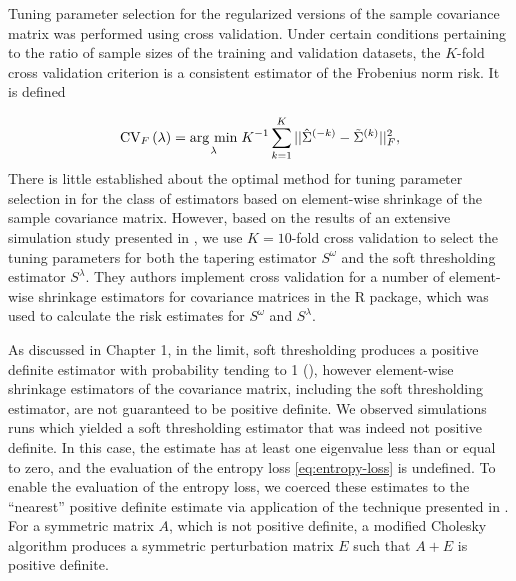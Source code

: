 %

Tuning parameter selection for the regularized versions of the sample covariance matrix was performed using cross validation. Under certain conditions pertaining to the ratio of sample sizes of the training and validation datasets, the $K$-fold cross validation criterion is a consistent estimator of the Frobenius norm risk. It is defined 

\begin{equation} \label{eq:K-fold-matrix--cv}
\mbox{CV}_F\left(\lambda \right) = \underset{\lambda}{\operatorname{arg}\,\operatorname{min}}\; K^{-1} \sum_{k = 1}^K  \vert \vert\hat{\Sigma}^{\left(-k\right)} - \tilde{\Sigma}^{\left(k\right)}  \vert \vert_F^2, 
\end{equation}
\noindent
There is little established about the optimal method for tuning parameter selection in for the class of estimators based on element-wise shrinkage of the sample covariance matrix.  However, based on the results of an extensive simulation study presented in \cite{fang2016tuning}, we use $K = 10$-fold cross validation to select the tuning parameters for both the tapering estimator $S^\omega$ and the soft thresholding estimator $S^{\lambda}$. They authors implement cross validation for a number of element-wise shrinkage estimators for covariance matrices in the \cite{CVTuningCov} R package, which was used to calculate the risk estimates for $S^{\omega}$ and $S^{\lambda}$. 

\bigskip

As discussed in Chapter 1, in the limit, soft thresholding produces a positive definite estimator with probability tending to 1 (\cite{rothman2009generalized}), however element-wise shrinkage estimators of the covariance matrix, including the soft thresholding estimator, are not guaranteed to be positive definite. We observed simulations runs which yielded a soft thresholding estimator that was indeed not positive definite.  In this case, the estimate has at least one eigenvalue less than or equal to zero, and the evaluation of the entropy loss \ref{eq:entropy-loss} is undefined. To enable the evaluation of the entropy loss, we coerced these estimates to the ``nearest'' positive definite estimate via application of the technique presented in \cite{cheng1998modified}.  For a symmetric matrix $A$, which is not positive definite,  a modified Cholesky algorithm produces a symmetric perturbation matrix $E$ such that $A + E$ is positive definite.

